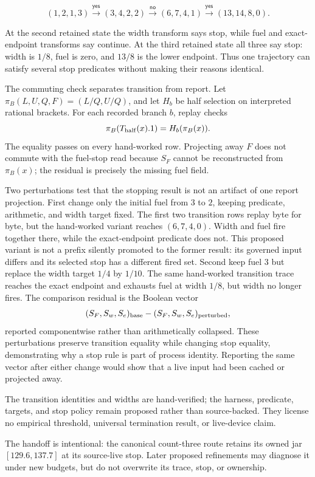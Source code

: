 \[
 (1,2,1,3)\xrightarrow{\mathsf{yes}}(3,4,2,2)
 \xrightarrow{\mathsf{no}}(6,7,4,1)
 \xrightarrow{\mathsf{yes}}(13,14,8,0).
\]

At the second retained state the width transform says stop, while fuel and exact-endpoint transforms say continue.
At the third retained state all three say stop: width is \(1/8\), fuel is zero, and \(13/8\) is the lower endpoint.
Thus one trajectory can satisfy several stop predicates without making their reasons identical.

The commuting check separates transition from report.  Let \(\pi_B(L,U,Q,F)=(L/Q,U/Q)\), and let
\(H_b\) be half selection on interpreted rational brackets.  For each recorded branch \(b\), replay checks
\[
                     \pi_B(T_{\rm half}(x).1)=H_b(\pi_B(x)).
\]
The equality passes on every hand-worked row.  Projecting away \(F\) does not commute with the fuel-stop read because
\(S_F\) cannot be reconstructed from \(\pi_B(x)\); the residual is precisely the missing fuel field.

Two perturbations test that the stopping result is not an artifact of one report projection.  First change only the
initial fuel from \(3\) to \(2\), keeping predicate, arithmetic, and width target fixed.  The first two transition rows
replay byte for byte, but the hand-worked variant reaches \((6,7,4,0)\).  Width and fuel fire together there, while the exact-endpoint
predicate does not.  This proposed variant is not a prefix silently promoted to the former result: its governed input differs and
its selected stop has a different fired set.  Second keep fuel \(3\) but replace the width target \(1/4\) by \(1/10\).
The same hand-worked transition trace reaches the exact endpoint and exhausts fuel at width \(1/8\), but width no
longer fires.
The comparison residual is the Boolean vector
\[
 (S_F,S_w,S_e)_{\rm base}-(S_F,S_w,S_e)_{\rm perturbed},
\]
reported componentwise rather than arithmetically collapsed.  These perturbations preserve transition equality while
changing stop equality, demonstrating why a stop rule is part of process identity.  Reporting the same vector after
either change would show that a live input had been cached or projected away.

The transition identities and widths are hand-verified; the harness, predicate, targets, and stop policy remain
proposed rather than source-backed.  They license no empirical threshold, universal termination result, or live-device
claim.

The handoff is intentional: the canonical count-three route retains its owned jar \([129.6,137.7]\) at its source-live
stop.  Later proposed refinements may diagnose it under new budgets, but do not overwrite its trace, stop, or ownership.
